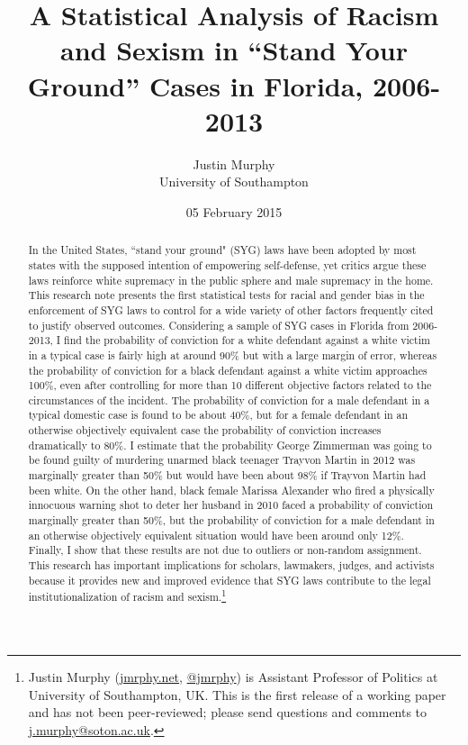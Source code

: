 \documentclass[12pt,article]{article}
\title{A Statistical Analysis of Racism and Sexism in ``Stand Your Ground''
Cases in Florida, 2006-2013}
\author{Justin Murphy\\University of Southampton}
\date{05 February 2015}
\begin{document}
\maketitle


\begin{abstract}
In the United States, ``stand your ground" (SYG) laws have been adopted by most states with the supposed intention of empowering self-defense, yet critics argue these laws reinforce white supremacy in the public sphere and male supremacy in the home. This research note presents the first statistical tests for racial and gender bias in the enforcement of SYG laws to control for a wide variety of other factors frequently cited to justify observed outcomes. Considering a sample of SYG cases in Florida from 2006-2013, I find the probability of conviction for a white defendant against a white victim in a typical case is fairly high at around 90\% but with a large margin of error, whereas the probability of conviction for a black defendant against a white victim approaches 100\%, even after controlling for more than 10 different objective factors related to the circumstances of the incident. The probability of conviction for a male defendant in a typical domestic case is found to be about 40\%, but for a female defendant in an otherwise objectively equivalent case the probability of conviction increases dramatically to 80\%. I estimate that the probability George Zimmerman was going to be found guilty of murdering unarmed black teenager Trayvon Martin in 2012 was marginally greater than 50\% but would have been about 98\% if Trayvon Martin had been white. On the other hand, black female Marissa Alexander who fired a physically innocuous warning shot to deter her husband in 2010 faced a probability of conviction marginally greater than 50\%, but the probability of conviction for a male defendant in an otherwise objectively equivalent situation would have been around only 12\%. Finally, I show that these results are not due to outliers or non-random assignment. This research has important implications for scholars, lawmakers, judges, and activists because it provides new and improved evidence that SYG laws contribute to the legal institutionalization of racism and sexism.\footnote{Justin Murphy (\url{jmrphy.net}, \href{http://twitter.com/jmrphy}{@jmrphy}) is Assistant Professor of Politics at University of Southampton, UK. This is the first release of a working paper and has not been peer-reviewed; please send questions and comments to \href{mailto:j.murphy@soton.ac.uk}{j.murphy@soton.ac.uk}.}
\end{abstract}
\onehalfspacing
\end{document}
